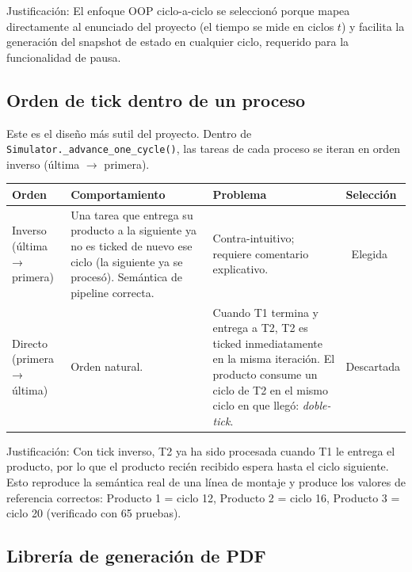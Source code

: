 \documentclass[12pt,letterpaper]{article}
\newcommand{\cmark}{\textcolor{accentgreen}{\ding{51}}}
\begin{document}
Justificación: El enfoque OOP ciclo-a-ciclo se seleccionó porque mapea directamente
al enunciado del proyecto (el tiempo se mide en ciclos $t$) y facilita la generación del snapshot
de estado en cualquier ciclo, requerido para la funcionalidad de pausa.

\subsection{Orden de tick dentro de un proceso}

Este es el diseño más sutil del proyecto. Dentro de \texttt{Simulator.\_advance\_one\_cycle()},
las tareas de cada proceso se iteran en orden inverso (última $\to$ primera).

\begin{center}
\renewcommand{\arraystretch}{1.25}
\begin{tabularx}{\textwidth}{|l|X|X|C{1.8cm}|}
\hline
\textbf{Orden} & \textbf{Comportamiento} & \textbf{Problema} & \textbf{Selección} \\
\hline
Inverso (última → primera) &
  Una tarea que entrega su producto a la siguiente ya no es ticked de nuevo ese ciclo (la siguiente ya se procesó). Semántica de pipeline correcta. &
  Contra-intuitivo; requiere comentario explicativo. &
  \cmark\ Elegida \\
\hline
Directo (primera → última) &
  Orden natural. &
  Cuando T1 termina y entrega a T2, T2 es ticked inmediatamente en la misma iteración. El producto consume un ciclo de T2 en el mismo ciclo en que llegó: \emph{doble-tick}. &
  Descartada \\
\hline
\end{tabularx}
\end{center}

Justificación: Con tick inverso, T2 ya ha sido procesada cuando T1 le entrega el producto,
por lo que el producto recién recibido espera hasta el ciclo siguiente. Esto reproduce la semántica
real de una línea de montaje y produce los valores de referencia correctos:
Producto 1 = ciclo 12, Producto 2 = ciclo 16, Producto 3 = ciclo 20 (verificado con 65 pruebas).

\subsection{Librería de generación de PDF}
\end{document}
